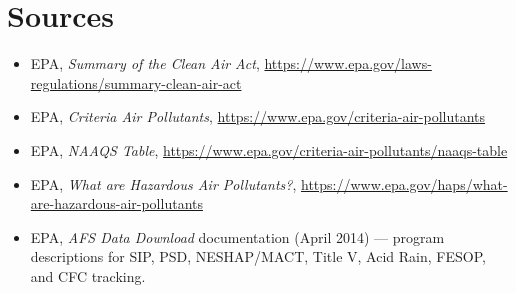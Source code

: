 \documentclass[11pt]{article}
\begin{document}
\section*{Sources}
\begin{itemize}
  \item EPA, \emph{Summary of the Clean Air Act}, \url{https://www.epa.gov/laws-regulations/summary-clean-air-act}
  \item EPA, \emph{Criteria Air Pollutants}, \url{https://www.epa.gov/criteria-air-pollutants}
  \item EPA, \emph{NAAQS Table}, \url{https://www.epa.gov/criteria-air-pollutants/naaqs-table}
  \item EPA, \emph{What are Hazardous Air Pollutants?}, \url{https://www.epa.gov/haps/what-are-hazardous-air-pollutants}
  \item EPA, \emph{AFS Data Download} documentation (April 2014) --- program descriptions for SIP, PSD,
  NESHAP/MACT, Title V, Acid Rain, FESOP, and CFC tracking.
\end{itemize}
\end{document}

